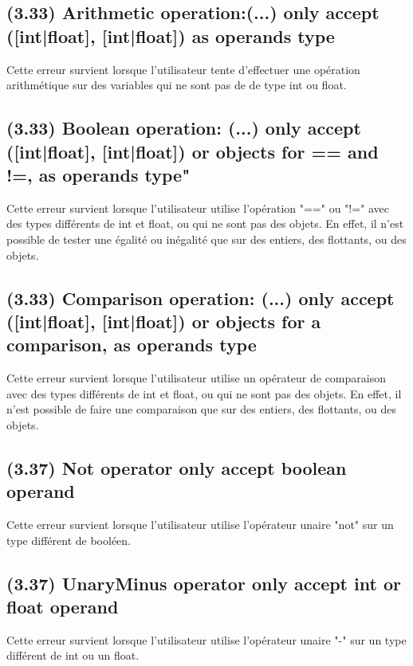 \documentclass[12pt, a4paper, one side]{article}
\begin{document}
\subsection{(3.33) Arithmetic operation:(...) only accept ([int|float], [int|float]) as operands type}
Cette erreur survient lorsque l'utilisateur tente d'effectuer une opération arithmétique sur des variables qui ne sont pas de de type int ou float.

\subsection{(3.33) Boolean operation: (...) only accept ([int|float], [int|float]) or objects for == and !=, as operands type"}
Cette erreur survient lorsque l'utilisateur utilise l'opération "==" ou "!=" avec des types différents de int et float, ou qui ne sont pas des objets. En effet, il n'est possible de tester une égalité ou inégalité que sur des entiers, des flottants, ou des objets.

\subsection{(3.33) Comparison operation: (...) only accept ([int|float], [int|float]) or objects for a comparison, as operands type}
Cette erreur survient lorsque l'utilisateur utilise un opérateur de comparaison avec des types différents de int et float, ou qui ne sont pas des objets. En effet, il n'est possible de faire une comparaison que sur des entiers, des flottants, ou des objets.

\subsection{(3.37) Not operator only accept boolean operand}
Cette erreur survient lorsque l'utilisateur utilise l'opérateur unaire "not" sur un type différent de booléen.

\subsection{(3.37) UnaryMinus operator only accept int or float operand}
Cette erreur survient lorsque l'utilisateur utilise l'opérateur unaire "-" sur un type différent de int ou un float.
\end{document}
